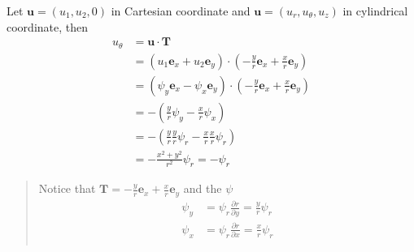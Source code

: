 Let $\textbf{u}=\left(u_1,u_2,0\right)$ in Cartesian coordinate and $\textbf{u} = \left(u_r, u_\theta, u_z\right)$ in cylindrical coordinate, then
\begin{equation}
\begin{aligned}
u_\theta
&= \textbf{u} \cdot \textbf{T}\\
&= \left(u_1\textbf{e}_x + u_2\textbf{e}_y\right)\cdot\left(-\frac{y}{r}\textbf{e}_x +\frac{x}{r}\textbf{e}_y\right)\\
&= \left(\psi_y\textbf{e}_x - \psi_x\textbf{e}_y\right)\cdot\left(-\frac{y}{r}\textbf{e}_x +\frac{x}{r}\textbf{e}_y\right)\\
&= -\left(\frac{y}{r} \psi_y - \frac{x}{r} \psi_x\right)\\
&= -\left(\frac{y}{r} \frac{y}{r}\psi_r - \frac{x}{r} \frac{x}{r}\psi_r\right)\\
&= - \frac{x^2+y^2}{r^2} \psi_r = -\psi_r
\end{aligned}
\end{equation}


\begin{quote}
	Notice that $\displaystyle \textbf{T} = -\frac{y}{r}\textbf{e}_x +\frac{x}{r}\textbf{e}_y$ and the $\psi$
\begin{equation}
\begin{aligned}
\psi_y &= \psi_r \frac{\partial r}{\partial y} = \frac{y}{r} \psi_r\\
\psi_x &= \psi_r \frac{\partial r}{\partial x} = \frac{x}{r} \psi_r\\
\end{aligned}
\end{equation}

\end{quote}
